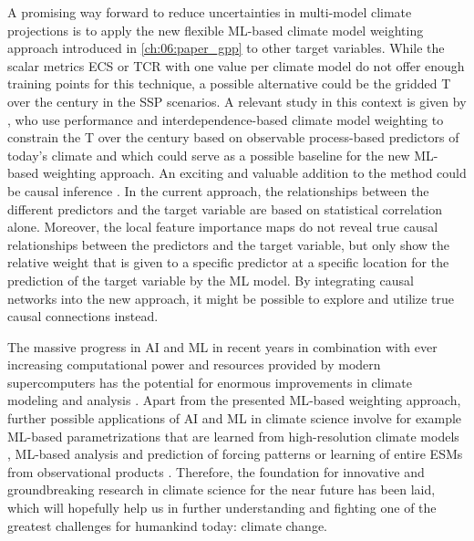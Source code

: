 A promising way forward to reduce uncertainties in multi-model climate
projections is to apply the new flexible \ac{ML}-based climate model weighting
approach introduced in \cref{ch:06:paper_gpp} to other target variables. While
the scalar metrics \ac{ECS} or \ac{TCR} with one value per climate model do not
offer enough training points for this technique, a possible alternative could
be the gridded \acl{T} over the  century in the \ac{SSP} scenarios. A
relevant study in this context is given by \textcite{Brunner2020}, who use
performance and interdependence-based climate model weighting to constrain the
\acl{T} over the  century based on observable process-based predictors
of today's climate and which could serve as a possible baseline for the new
\ac{ML}-based weighting approach. An exciting and valuable addition to the
method could be causal inference \autocite{Nowack2020, Runge2019}. In the
current approach, the relationships between the different predictors and the
target variable are based on statistical correlation alone. Moreover, the local
feature importance maps do not reveal true causal relationships between the
predictors and the target variable, but only show the relative weight that is
given to a specific predictor at a specific location for the prediction of the
target variable by the \ac{ML} model. By integrating causal networks into the
new approach, it might be possible to explore and utilize true causal
connections instead.

The massive progress in \ac{AI} and \ac{ML} in recent years in combination with
ever increasing computational power and resources provided by modern
supercomputers has the potential for enormous improvements in climate modeling
and analysis \autocite{Reichstein2019}. Apart from the presented \ac{ML}-based
weighting approach, further possible applications of \ac{AI} and \ac{ML} in
climate science involve for example \ac{ML}-based parametrizations that are
learned from high-resolution climate models \autocite{Rasp2018}, \ac{ML}-based
analysis and prediction of forcing patterns \autocite{Barnes2019,
  Mansfield2020} or learning of entire \acp{ESM} from observational products
\autocite{Geer2021}. Therefore, the foundation for innovative and
groundbreaking research in climate science for the near future has been laid,
which will hopefully help us in further understanding and fighting one of the
greatest challenges for humankind today: climate change.

